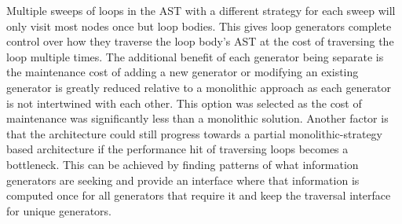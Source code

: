 Multiple sweeps of loops in the AST with a different strategy for each sweep
will only visit most nodes once but loop bodies.
This gives loop generators complete control over how they traverse the loop
body's AST at the cost of traversing the loop multiple times. 
The additional benefit of each generator being separate is the maintenance cost
of adding a new generator or modifying an existing generator is greatly reduced
relative to a monolithic approach as each generator is not intertwined with
each other.
This option was selected as the cost of maintenance was significantly less
than a monolithic solution.
Another factor is that the architecture could still progress towards
a partial monolithic-strategy based architecture if the performance hit
of traversing loops becomes a bottleneck.
This can be achieved by finding patterns of what information generators are
seeking and provide an interface where that information is computed once for
all generators that require it and keep the traversal interface for unique generators.

